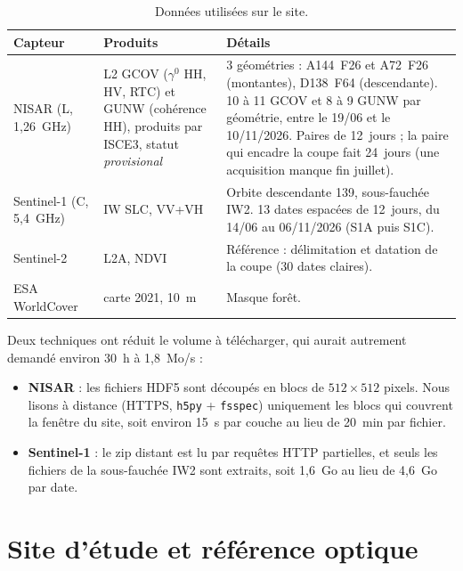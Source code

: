 \documentclass[11pt,a4paper]{article}
\begin{document}
\begin{table}[htbp]
\centering\small
\caption{Données utilisées sur le site.}
\label{tab-data}
\begin{tabular}{p{2.6cm}p{5.6cm}p{6.6cm}}
\toprule
Capteur & Produits & Détails \\
\midrule
NISAR (L, 1,26~GHz) & L2 GCOV ($\gamma^0$ HH, HV, RTC) et GUNW (cohérence HH), produits par ISCE3, statut
\emph{provisional} & 3 géométries : A144~F26 et A72~F26 (montantes), D138~F64 (descendante). 10 à 11 GCOV et
8 à 9 GUNW par géométrie, entre le 19/06 et le 10/11/2026. Paires de 12~jours ; la paire qui encadre la coupe fait
24~jours (une acquisition manque fin juillet). \\
Sentinel-1 (C, 5,4~GHz) & IW SLC, VV+VH & Orbite descendante 139, sous-fauchée IW2. 13 dates espacées de 12~jours,
du 14/06 au 06/11/2026 (S1A puis S1C). \\
Sentinel-2~\cite{drusch2012sentinel2} & L2A, NDVI & Référence : délimitation et datation de la coupe (30 dates
claires). \\
ESA WorldCover~\cite{zanaga2022worldcover} & carte 2021, 10~m & Masque forêt. \\
\bottomrule
\end{tabular}
\end{table}

Deux techniques ont réduit le volume à télécharger, qui aurait autrement demandé environ 30~h à 1,8~Mo/s :
\begin{itemize}
\item \textbf{NISAR} : les fichiers HDF5 sont découpés en blocs de $512\times512$ pixels. Nous lisons à distance
  (HTTPS, \texttt{h5py} + \texttt{fsspec}) uniquement les blocs qui couvrent la fenêtre du site, soit environ 15~s
  par couche au lieu de 20~min par fichier.
\item \textbf{Sentinel-1} : le zip distant est lu par requêtes HTTP partielles, et seuls les fichiers de la
  sous-fauchée IW2 sont extraits, soit 1,6~Go au lieu de 4,6~Go par date.
\end{itemize}

\section{Site d'étude et référence optique}
\end{document}
